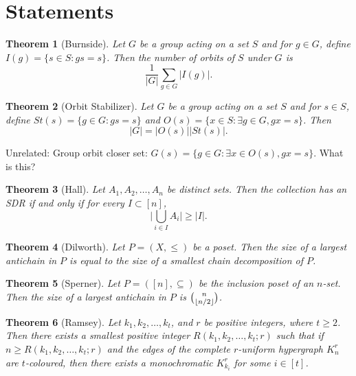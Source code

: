 \documentclass[12]{article}
\DeclarePairedDelimiter\floor{\lfloor}{\rfloor}
\newtheorem{thm}{Theorem}[section] %
\theoremstyle{definition}
\begin{document}
	\section{Statements}
	
	\begin{thm}[Burnside]
		Let $G$ be a group acting on a set $S$ and for $g \in G$, define $I(g) = \{s \in S: gs = s\}$.  Then the number of orbits of $S$ under $G$ is
		$$\frac{1}{|G|} \sum_{g \in G} |I(g)|.$$
	\end{thm}
	
	\begin{thm}[Orbit Stabilizer]
		Let $G$ be a group acting on a set $S$ and for $s \in S$, define $St(s) = \{g \in G: gs = s\}$ and $O(s) = \{x \in S: \exists g \in G, gx = s\}$.  Then 
		$$|G| = |O(s)| |St(s)|.$$
	\end{thm}

	Unrelated: Group orbit closer set: $G(s) = \{g \in G: \exists x \in O(s), gx = s\}$.  What is this?
	
	\begin{thm}[Hall]
		Let $A_1, A_2, \ldots, A_n$ be distinct sets.  Then the collection has an SDR if and only if for every $I \subset [n]$,
		$$\Big|\bigcup_{i \in I} A_i \Big| \geq |I|.$$
	\end{thm}
	
	\begin{thm}[Dilworth]
		Let $P = (X, \leq)$ be a poset.  Then the size of a largest antichain in $P$ is equal to the size of a smallest chain decomposition of $P$.
	\end{thm}

	\begin{thm}[Sperner]
		Let $P = ([n], \subseteq)$ be the inclusion poset of an $n$-set.  Then the size of a largest antichain in $P$ is ${n \choose \floor{n/2}}$.
	\end{thm}
	

	\begin{thm}[Ramsey]
		Let $k_1, k_2, \ldots, k_t$, and $r$ be positive integers, where $t \geq 2$.  Then there exists a smallest positive integer $R(k_1, k_2, \ldots, k_t; r)$ such that if $n \geq R(k_1, k_2, \ldots, k_t; r)$ and the edges of the complete $r$-uniform hypergraph $K_n^r$ are $t$-coloured, then there exists a monochromatic $K_{k_i}^r$ for some $i \in [t]$.
	\end{thm}
\end{document}
